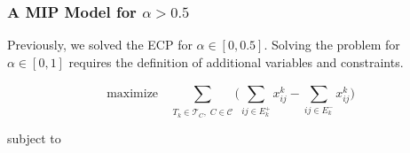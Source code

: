 \subsubsection{A MIP Model for $\alpha > 0.5$}

Previously, we solved the \acrshort{ECP} for $\alpha \in [0, 0.5]$. Solving the problem for $\alpha \in [0, 1]$ requires the definition of
additional variables and constraints.

\begin{equation}
	\text{maximize}\quad \sum_{ T_{k} \in \mathcal{T}_{C}, \; C \in
		\mathcal{\hat{C}} } \big( \sum^{}_{ij \in E^{+}_k } x_{ij}
	^{k} - \sum_{ij \in E^{-} _k} x_{ij} ^{k} \big)
\end{equation} \begin{center} subject to \end{center}
